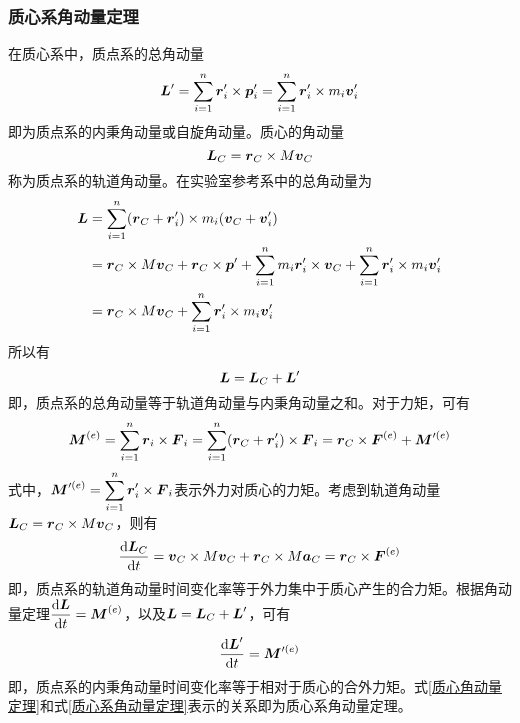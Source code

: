 \subsubsection{质心系角动量定理}
在质心系中，质点系的总角动量
\begin{equation}
	\boldsymbol{L}' = \sum_{i=1}^n \boldsymbol{r}'_i \times \boldsymbol{p}'_i = \sum_{i=1}^n \boldsymbol{r}'_i \times m_i \boldsymbol{v}'_i
\end{equation}
即为质点系的{\heiti 内秉角动量}或{\heiti 自旋角动量}。质心的角动量
\begin{equation}
	\boldsymbol{L}_C = \boldsymbol{r}_C \times M\boldsymbol{v}_C
\end{equation}
称为质点系的{\heiti 轨道角动量}。在实验室参考系中的总角动量为
\begin{align*}
	\boldsymbol{L} & = \sum_{i=1}^n (\boldsymbol{r}_C + \boldsymbol{r}'_i) \times m_i(\boldsymbol{v}_C + \boldsymbol{v}'_i) \\
	& = \boldsymbol{r}_C \times M\boldsymbol{v}_C + \boldsymbol{r}_C\times \boldsymbol{p}' + \sum_{i=1}^n m_i \boldsymbol{r}'_i \times \boldsymbol{v}_C + \sum_{i=1}^n \boldsymbol{r}'_i \times m_i \boldsymbol{v}'_i \\
	& = \boldsymbol{r}_C \times M\boldsymbol{v}_C + \sum_{i=1}^n \boldsymbol{r}'_i \times m_i \boldsymbol{v}'_i
\end{align*}
所以有
\begin{equation}
	\boldsymbol{L} = \boldsymbol{L}_C+\boldsymbol{L}'
\end{equation}
即，质点系的总角动量等于轨道角动量与内秉角动量之和。对于力矩，可有
\begin{equation}
	\boldsymbol{M}^{(e)} = \sum_{i=1}^n \boldsymbol{r}_i \times \boldsymbol{F}_i = \sum_{i=1}^n (\boldsymbol{r}_C+\boldsymbol{r}'_i) \times \boldsymbol{F}_i = \boldsymbol{r}_C \times \boldsymbol{F}^{(e)} + \boldsymbol{M}'^{(e)}
\end{equation}
式中，$\displaystyle \boldsymbol{M}'^{(e)} = \sum_{i=1}^n \boldsymbol{r}'_i \times \boldsymbol{F}_i$表示外力对质心的力矩。考虑到轨道角动量$\boldsymbol{L}_C = \boldsymbol{r}_C \times M\boldsymbol{v}_C$，则有
\begin{equation}
	\frac{\mathrm{d} \boldsymbol{L}_C}{\mathrm{d} t} = \boldsymbol{v}_C \times M\boldsymbol{v}_C + \boldsymbol{r}_C \times M \boldsymbol{a}_C = \boldsymbol{r}_C \times \boldsymbol{F}^{(e)}
	\label{质心角动量定理}
\end{equation}
即，质点系的轨道角动量时间变化率等于外力集中于质心产生的合力矩。根据角动量定理$\dfrac{\mathrm{d} \boldsymbol{L}}{\mathrm{d} t} = \boldsymbol{M}^{(e)}$，以及$\boldsymbol{L} = \boldsymbol{L}_C + \boldsymbol{L}'$，可有
\begin{equation}
	\frac{\mathrm{d} \boldsymbol{L}'}{\mathrm{d} t} = \boldsymbol{M}'^{(e)}
	\label{质心系角动量定理}
\end{equation}
即，质点系的内秉角动量时间变化率等于相对于质心的合外力矩。式\eqref{质心角动量定理}和式\eqref{质心系角动量定理}表示的关系即为{\heiti 质心系角动量定理}。

